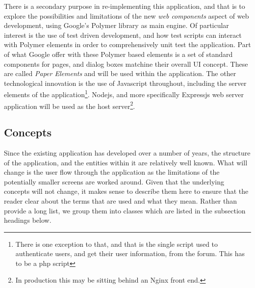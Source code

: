 \documentclass{czen}
\begin{document}
There is a secondary purpose in re-implementing this application, and that is to explore the possibilities and limitations of the new \emph{web components} aspect of web development, using Google's Polymer library as main engine.  Of particular interest is the use of test driven development, and how test scripts can interact with Polymer elements in order to comprehensively unit test the application.  Part of what Google offer with these Polymer based elements is a set of standard components for pages, and dialog boxes matchine their overall UI concept.  These are called \emph{Paper Elements} and will be used within the application. The other technological innovation is the use of Javascript throughout, including the server elements of the application\footnote{There is one exception to that, and that is the single script used to authenticate users, and get their user information, from the forum. This has to be a php script}.  Nodejs, and more specifically Expressjs web server application will be used as the host server\footnote{In production this may be sitting behind an Nginx front end.}.
\subsection{Concepts}
Since the existing application has developed over a number of years, the structure of the application, and the entities within it are relatively well known.  What will change is the user flow through the application as the limitations of the potentially smaller screens are worked around.  Given that the underlying concepts will not change, it makes sense to describe them here to ensure that the reader clear about the terms that are used and what they mean.  Rather than provide a long list, we group them into classes which are listed in the subsection headings below.
\end{document}
